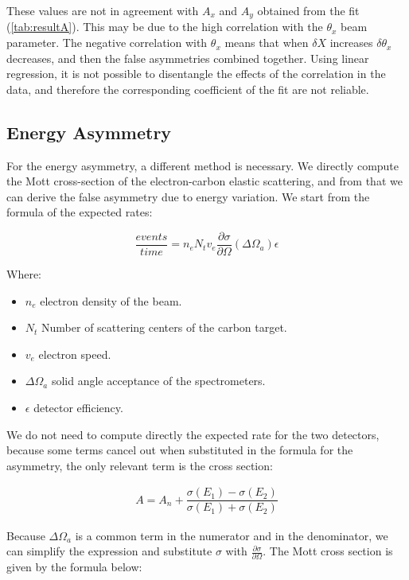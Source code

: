These values are not in agreement with $A_{x}$ and $A_{y}$ obtained from the fit (\ref{tab:resultA}). This may be due to the high correlation with the $\theta_{x}$ beam parameter. The negative correlation with $\theta_{x}$ means that when $\delta X$ increases $\delta \theta_{x}$ decreases, and then the false asymmetries combined together. Using linear regression, it is not possible to disentangle the effects of the correlation in the data, and therefore the corresponding coefficient of the fit are not reliable. 

\subsection{Energy Asymmetry}

For the energy asymmetry, a different method is necessary. We directly compute the Mott cross-section of the electron-carbon elastic scattering, and from that we can derive the false asymmetry due to energy variation.
We start from the formula of the expected rates:

\begin{equation}
\frac{events}{time} = n_{e} N_{t} v_{e} \frac{\partial \sigma}{\partial \Omega} (\Delta \Omega_{a}) \epsilon 
\end{equation} 

Where:
\begin{itemize}
\item $n_{e}$ electron density of the beam.
\item $N_t$ Number of scattering centers of the carbon target.
\item $v_{e}$ electron speed.
\item $\Delta \Omega_{a}$ solid angle acceptance of the spectrometers.
\item $\epsilon$ detector efficiency.
\end{itemize}

We do not need to compute directly the expected rate for the two detectors, because some terms cancel out when substituted in the formula for the asymmetry, the only relevant term is the cross section:

\begin{align*}
A = A_{n} + \dfrac{\sigma(E_{1}) - \sigma(E_{2})}{\sigma(E_{1}) + \sigma(E_{2})}
\end{align*}

Because $\Delta \Omega_{a}$ is a common term in the numerator and in the denominator, we can simplify the expression and substitute $\sigma $ with $ \frac{\partial \sigma}{ \partial \Omega}$.
The Mott cross section is given by the formula below:

